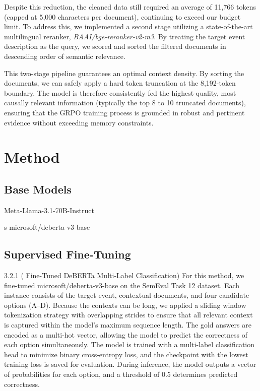 \documentclass{article}
\begin{document}
Despite this reduction, the cleaned data still required an average of 11,766 tokens (capped at 5,000 characters per document), continuing to exceed our budget limit. To address this, we implemented a second stage utilizing a state-of-the-art multilingual reranker, \textit{BAAI/bge-reranker-v2-m3}. By treating the target event description as the query, we scored and sorted the filtered documents in descending order of semantic relevance.

This two-stage pipeline guarantees an optimal context density. By sorting the documents, we can safely apply a hard token truncation at the 8,192-token boundary. The model is therefore consistently fed the highest-quality, most causally relevant information (typically the top 8 to 10 truncated documents), ensuring that the GRPO training process is grounded in robust and pertinent evidence without exceeding memory constraints.

\section{Method}
\subsection{Base Models}

Meta-Llama-3.1-70B-Instruct

s
microsoft/deberta-v3-base



\subsection{Supervised Fine-Tuning}

3.2.1 ( Fine-Tuned DeBERTa Multi-Label Classification)
For this method, we fine-tuned microsoft/deberta-v3-base on the SemEval Task 12 dataset. Each instance consists of the target event, contextual documents, and four candidate options (A–D). Because the contexts can be long, we applied a sliding window tokenization strategy with overlapping strides to ensure that all relevant context is captured within the model’s maximum sequence length. The gold answers are encoded as a multi-hot vector, allowing the model to predict the correctness of each option simultaneously. The model is trained with a multi-label classification head to minimize binary cross-entropy loss, and the checkpoint with the lowest training loss is saved for evaluation. During inference, the model outputs a vector of probabilities for each option, and a threshold of 0.5 determines predicted correctness.
\end{document}
